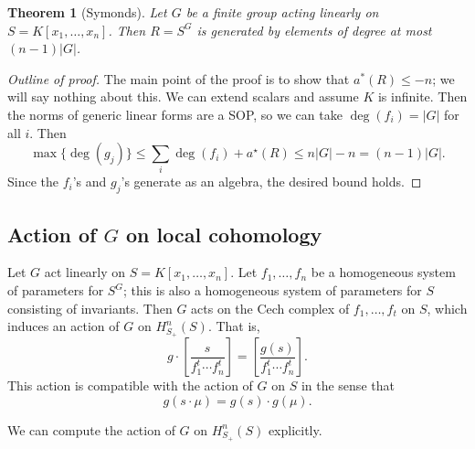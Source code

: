\documentclass[12pt]{amsart}
\newtheorem{theorem}{Theorem}[section]
\theoremstyle{definition}
\numberwithin{equation}{theorem}
\begin{document}
\begin{theorem}[Symonds] Let $G$ be a finite group acting linearly on $S=K[x_1,\dots,x_n]$. Then $R=S^G$ is generated by elements of degree at most $(n-1)|G|$.
\end{theorem}
\begin{proof}[Outline of proof]
The main point of the proof is to show that $a^*(R)\leq -n$; we will say nothing about this. We can extend scalars and assume $K$ is infinite. Then the norms of generic linear forms are a SOP, so we can take $\deg(f_i) = |G|$ for all $i$. Then
\[ \max\big\{ \deg(g_j)\big\} \leq \sum_i \deg(f_i) + a^{\star}(R) \leq n |G| - n = (n-1)|G|.\]
Since the $f_i$'s and $g_j$'s generate as an algebra, the desired bound holds.
\end{proof}

\subsection*{Action of $G$ on local cohomology}
Let $G$ act linearly on $S=K[x_1,\dots,x_n]$. Let $f_1,\dots,f_n$ be a homogeneous system of parameters for $S^G$; this is also a homogeneous system of parameters for $S$ consisting of invariants. Then $G$ acts on the Cech complex of $f_1,\dots,f_t$ on $S$, which induces an action of $G$ on $H^n_{S_+}(S)$. That is,
\[ g \cdot \left[ \frac{ s}{ f_1^t \cdots f_n^t} \right] = \left[ \frac{g(s)} {  f_1^t \cdots f_n^t} \right] .\]
This action is compatible with the action of $G$ on $S$ in the sense that
\[ g( s \cdot \mu) = g(s) \cdot g(\mu).\]

We can compute the action of $G$ on $H^n_{S_+}(S)$ explicitly. 
\end{document}
